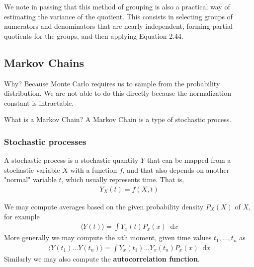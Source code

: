 \documentclass[twoside,english]{uiofysmaster}
\newcommand*\dif{\mathop{}\!\mathrm{d}}
\begin{document}
We note in passing that this method of grouping is also a practical way of estimating the variance of the quotient. This consists in selecting groups of numerators and denominators that are nearly independent, forming partial quotients for the groups, and then applying Equation 2.44. \cite{Kalos2008}

\subsection{Markov Chains}
Why? Because Monte Carlo requires us to sample from the probability distribution. We are not able to do this directly because the normalization constant is intractable. 

What is a Markov Chain?
A Markov Chain is a type of stochastic process. 

\subsubsection{Stochastic processes}
A stochastic process is a stochastic quantity $Y$ that can be mapped from a stochastic variable $X$ with a function $f$, and that also depends on another "normal" variable $t$, which usually represents time. That is,
\begin{align}
	Y_X (t) = f(X, t)
\end{align}

We may compute averages based on the given probability density $P_X(X)$ of $X$, for example
\begin{align}
	\langle Y(t) \rangle = \int Y_x (t) P_x(x) \dif x
\end{align}
More generally we may compute the $n$th moment, given time values $t_1,...,t_n$ as
\begin{align}
	\langle Y(t_1) ... Y(t_n) \rangle = \int Y_x(t_1) ... Y_x(t_n) P_x (x) \dif x 
\end{align}
Similarly we may also compute the \textbf{autocorrelation function}.
\end{document}
